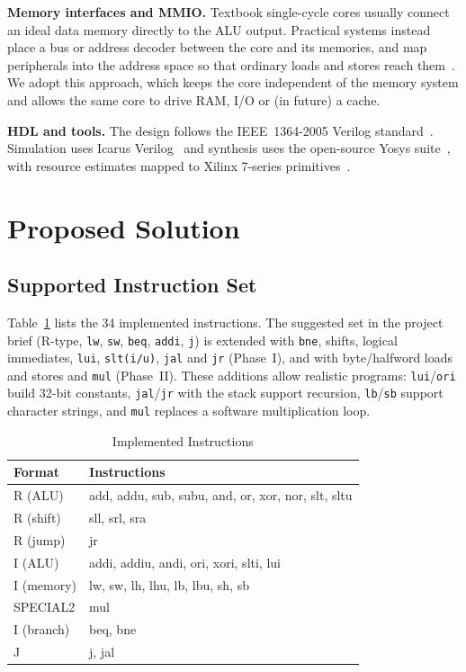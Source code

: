 \documentclass[conference]{IEEEtran}
\begin{document}
\textbf{Memory interfaces and MMIO.} Textbook single-cycle cores usually connect an ideal data memory directly to the ALU output. Practical systems instead place a bus or address decoder between the core and its memories, and map peripherals into the address space so that ordinary loads and stores reach them~\cite{harris,hennessy_ca}. We adopt this approach, which keeps the core independent of the memory system and allows the same core to drive RAM, I/O or (in future) a cache.

\textbf{HDL and tools.} The design follows the IEEE~1364-2005 Verilog standard~\cite{verilog}. Simulation uses Icarus Verilog~\cite{icarus} and synthesis uses the open-source Yosys suite~\cite{yosys}, with resource estimates mapped to Xilinx 7-series primitives~\cite{ug474}.

\section{Proposed Solution}

\subsection{Supported Instruction Set}
Table~\ref{tab:isa} lists the 34 implemented instructions. The suggested set in the project brief (R-type, \texttt{lw}, \texttt{sw}, \texttt{beq}, \texttt{addi}, \texttt{j}) is extended with \texttt{bne}, shifts, logical immediates, \texttt{lui}, \texttt{slt(i/u)}, \texttt{jal} and \texttt{jr} (Phase~I), and with byte/halfword loads and stores and \texttt{mul} (Phase~II). These additions allow realistic programs: \texttt{lui}/\texttt{ori} build 32-bit constants, \texttt{jal}/\texttt{jr} with the stack support recursion, \texttt{lb}/\texttt{sb} support character strings, and \texttt{mul} replaces a software multiplication loop.

\begin{table}[htbp]
\caption{Implemented Instructions}
\label{tab:isa}
\centering
\footnotesize
\begin{tabular}{@{}ll@{}}
\toprule
Format & Instructions \\
\midrule
R (ALU) & add, addu, sub, subu, and, or, xor, nor, slt, sltu \\
R (shift) & sll, srl, sra \\
R (jump) & jr \\
I (ALU) & addi, addiu, andi, ori, xori, slti, lui \\
I (memory) & lw, sw, lh, lhu, lb, lbu, sh, sb \\
SPECIAL2 & mul \\
I (branch) & beq, bne \\
J & j, jal \\
\bottomrule
\end{tabular}
\end{table}
\end{document}
